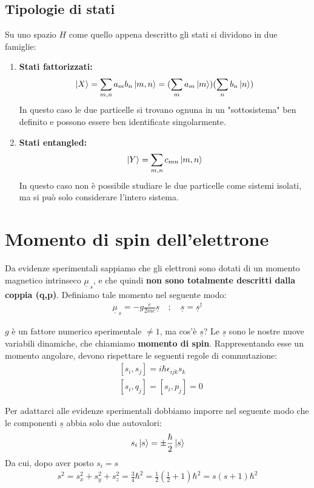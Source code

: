 \subsection{Tipologie di stati}

Su uno spazio $H$ come quello appena descritto gli stati si dividono in due famiglie:

\begin{enumerate}
	\item \textbf{Stati fattorizzati:} 
	\begin{align}
	\ket{X}= \sum_{m,n} a_m b_n \ket{m,n}= (\sum_{m} a_m\ket{m})(\sum_{n}b_n \ket{n})
	\end{align}
	 In questo caso le due particelle si trovano ognuna in un "sottosistema" ben definito e possono essere ben identificate singolarmente.
    \item \textbf{Stati entangled:} 
	\begin{align}
	\ket{Y}= \sum_{m,n} c_{mn} \ket{m,n}
	\end{align}
	In questo caso non è possibile studiare le due particelle come sistemi isolati, ma si può solo considerare l'intero sistema.
\end{enumerate}

\newpage

\section{Momento di spin dell'elettrone}

Da evidenze sperimentali sappiamo che gli elettroni sono dotati di un momento magnetico intrinseco $\underline{\mu}_{\,s}$, e che quindi \textbf{non sono totalmente descritti dalla coppia (q,p)}. Definiamo tale momento nel seguente modo:
\begin{align}
\underline{\mu}_{\,s} = -g\frac{e}{2mc} \underline{s} \quad;\quad \underline{s}=\underline{s}^\dagger
\end{align}

$g$ è un fattore numerico sperimentale $\neq 1$, ma cos'è $\underline{s}$?  
Le $\underline{s}$ sono le nostre nuove variabili dinamiche, che chiamiamo \textbf{momento di spin}. Rappresentando esse un momento angolare, devono rispettare le seguenti regole di commutazione:
\begin{align}
&[s_i,s_j]=i\hbar \epsilon_{ijk}s_k\\
&[s_i,q_j]=[s_i,p_j]=0
\end{align}

Per adattarci alle evidenze sperimentali dobbiamo imporre nel seguente modo che le componenti $\underline{s}$ abbia solo due autovalori:
\begin{align}
s_i \ket{s} = \pm \frac{\hbar}{2} \ket{s}
\end{align}
Da cui, dopo aver posto $s_i = s $
\begin{align}
s^2 = s_x^2 + s_y^2 + s_z^2 = \frac{3}{4}\hbar^2 = \frac{1}{2} \left(\frac{1}{2} + 1\right) \hbar^2 = s(s+1)\hbar^2
\end{align}

